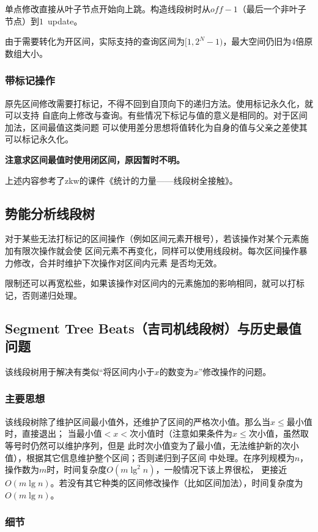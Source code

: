 单点修改直接从叶子节点开始向上跳。构造线段树时从$off-1$（最后一个非叶子节点）到$1$~update。

由于需要转化为开区间，实际支持的查询区间为$[1,2^N-1)$，最大空间仍旧为4倍原数组大小。
\subsubsection{带标记操作}
原先区间修改需要打标记，不得不回到自顶向下的递归方法。使用标记永久化，就可以支持
自底向上修改与查询。有些情况下标记与值的意义是相同的。对于区间加法，区间最值这类问题
可以使用差分思想将值转化为自身的值与父亲之差使其可以标记永久化。

{\bfseries 注意求区间最值时使用闭区间，原因暂时不明。}

上述内容参考了zkw的课件《统计的力量——线段树全接触》。
\subsection{势能分析线段树}
对于某些无法打标记的区间操作（例如区间元素开根号），若该操作对某个元素施加有限次操作就会使
区间元素不再变化，同样可以使用线段树。每次区间操作暴力修改，合并时维护下次操作对区间内元素
是否均无效。

限制还可以再宽松些，如果该操作对区间内的元素施加的影响相同，就可以打标记，否则递归处理。
\subsection{Segment Tree Beats（吉司机线段树）与历史最值问题}
该线段树用于解决有类似``将区间内小于$x$的数变为$x$''修改操作的问题。
\subsubsection{主要思想}

该线段树除了维护区间最小值外，还维护了区间的严格次小值。那么当$x\leq$最小值时，直接退出；
当最小值$<x<$次小值时（注意如果条件为$x\leq$次小值，虽然取等号时仍然可以维护序列，但是
此时次小值变为了最小值，无法维护新的次小值），根据其它信息维护整个区间；否则递归到子区间
中处理。在序列规模为$n$，操作数为$m$时，时间复杂度$O(m\lg^2 n)$，一般情况下该上界很松，
更接近$O(m\lg n)$。若没有其它种类的区间修改操作（比如区间加法），时间复杂度为$O(m\lg n)$。
\subsubsection{细节}
